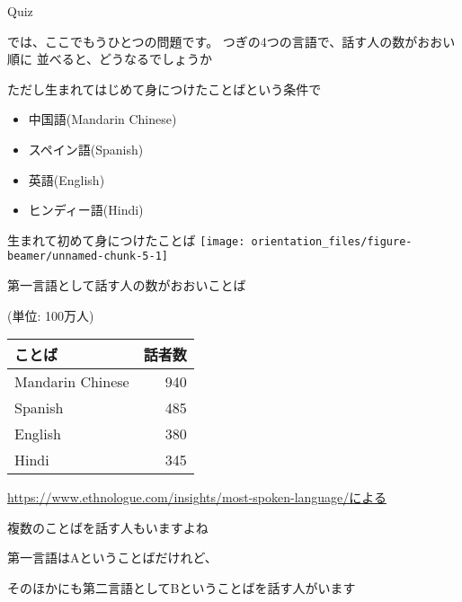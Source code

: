 \documentclass[
  ignorenonframetext,
  aspectratio=169,
  xcolor=dvipsnames]{beamer}
\providecommand{\tightlist}{%
  \setlength{\itemsep}{0pt}\setlength{\parskip}{0pt}}
\begin{document}
\begin{frame}{Quiz}
\label{quiz-1}
\Large

では、ここでもうひとつの問題です。
つぎの4つの言語で、話す人の数がおおい順に
並べると、どうなるでしょうか\pause

ただし生まれてはじめて身につけたことばという条件で

\pause

\begin{itemize}[<+->]
\tightlist
\item
  中国語(Mandarin Chinese)
\item
  スペイン語(Spanish)
\item
  英語(English)
\item
  ヒンディー語(Hindi)
\end{itemize}
\end{frame}

\begin{frame}{生まれて初めて身につけたことば}
\label{ux751fux307eux308cux3066ux521dux3081ux3066ux8eabux306bux3064ux3051ux305fux3053ux3068ux3070}
\texttt{[image: orientation\_files/figure-beamer/unnamed-chunk-5-1]}
\end{frame}

\begin{frame}{第一言語として話す人の数がおおいことば}
\label{ux7b2cux4e00ux8a00ux8a9eux3068ux3057ux3066ux8a71ux3059ux4ebaux306eux6570ux304cux304aux304aux3044ux3053ux3068ux3070}
\raggedleft

(単位: 100万人)

\vfill

\Large
\centering

\begin{tabular}{lr}
\toprule
ことば & 話者数\\
\midrule
Mandarin Chinese & 940\\
Spanish & 485\\
English & 380\\
Hindi & 345\\
\bottomrule
\end{tabular}

\vfill

\raggedleft
\scriptsize

\url{https://www.ethnologue.com/insights/most-spoken-language/による}
\end{frame}

\begin{frame}{複数のことばを話す人もいますよね}
\label{ux8907ux6570ux306eux3053ux3068ux3070ux3092ux8a71ux3059ux4ebaux3082ux3044ux307eux3059ux3088ux306d}
\Large

第一言語はAということばだけれど、

そのほかにも第二言語としてBということばを話す人がいます
\end{frame}
\end{document}
